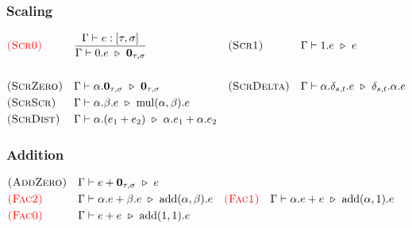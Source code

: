 \subsubsection*{Scaling}
\begin{align*}
  & \textcolor{red}{\textsc{(Scr0)}} && \frac{\Gamma \vdash e : [\tau, \sigma]}{\Gamma \vdash 0.e \ \triangleright\  \textbf{0}_{\tau, \sigma}}
  && \textsc{(Scr1)} && \Gamma \vdash 1.e \ \triangleright\  e \\
  \\
  & \textsc{(ScrZero)} && \Gamma \vdash \alpha.\mathbf{0}_{\tau, \sigma} \ \triangleright\  \mathbf{0}_{\tau, \sigma}
  && \textsc{(ScrDelta)} && \Gamma \vdash \alpha.\delta_{s, t}.e \ \triangleright\  \delta_{s, t}.\alpha.e \\
  & \textsc{(ScrScr)} && \Gamma \vdash \alpha.\beta.e \ \triangleright\  \mathrm{mul}(\alpha, \beta).e
  \\
  & \textsc{(ScrDist)} && \Gamma \vdash \alpha.(e_1 + e_2) \ \triangleright\  \alpha.e_1 + \alpha.e_2
\end{align*}

\subsubsection*{Addition}
\begin{align*}
  & \textsc{(AddZero)} && \Gamma \vdash e + \textbf{0}_{\tau, \sigma} \ \triangleright\  e \\
  & \textcolor{red}{\textsc{(Fac2)}} && 
    \Gamma \vdash \alpha.e + \beta.e \ \triangleright\  \mathrm{add}(\alpha, \beta).e
  && \textcolor{red}{\textsc{(Fac1)}} &&
    \Gamma \vdash \alpha.e + e \ \triangleright\  \mathrm{add}(\alpha, 1).e \\
  & \textcolor{red}{\textsc{(Fac0)}} &&
    \Gamma \vdash e + e \ \triangleright\  \mathrm{add}(1, 1).e
\end{align*}

